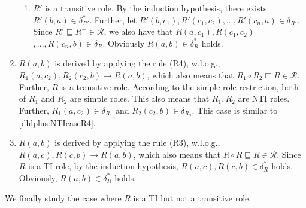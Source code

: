 \documentclass[final,1p,times]{elsarticle}
\begin{document}
\begin{enumerate}[leftmargin=12ex,label=Case~2.\arabic*, ref=Case~2.\arabic*]
\begin{enumerate}[leftmargin=8ex,label=Case~2.2.\arabic*]
     \item $R'$ is a transitive role.
        By the induction hypothesis, there exists $R'(b,a)\in\delta^*_{R'}$.
        Further, let $R'(b,c_1),R'(c_1,c_2),...,R'(c_n,a)\in\delta_{R'}$.
        Since $R'\sqsubseteq R^-\in\mathcal{R}$, we also have that
        $R(a,c_1),R(c_1,c_2)$ $,...,R(c_n,b)\in\delta_{R}$. Obviously $R(a,b)\in\delta^*_{R}$ holds.
    \end{enumerate}

\item $R(a,b)$ is derived by applying the rule (R4), w.l.o.g.,
    $R_1(a,c_2),R_2(c_2,b)\rightarrow R(a,b)$,
    which also means that $R_1\circ R_2\sqsubseteq R\in\mathcal{R}$.
    Further, $R$ is a transitive role. According to the simple-role restriction,
    both of $R_1$ and $R_2$ are simple roles.
    This also
    means that $R_1, R_2$ are NTI roles. Further, $R_1(a,c_2)\in\delta_{R_1}$ and $R_2(c_2,b)\in\delta_{R_2}$.
    This case is similar to \ref{dhlplus:NTIcaseR4}.

\item $R(a,b)$ is derived by applying the rule (R3), w.l.o.g., $R(a,c),R(c,b)\rightarrow R(a,b)$,
    which also means that $R\circ R\sqsubseteq R\in\mathcal{R}$.
    Since $R$ is a TI role, by the induction hypothesis,
    $R(a,c),R(c,b)\in\delta^*_{R}$ holds. Obviously, $R(a,b)\in\delta^*_{R}$ holds.
\end{enumerate}

We finally study the case where $R$ is a TI but not a transitive role.
\end{document}
